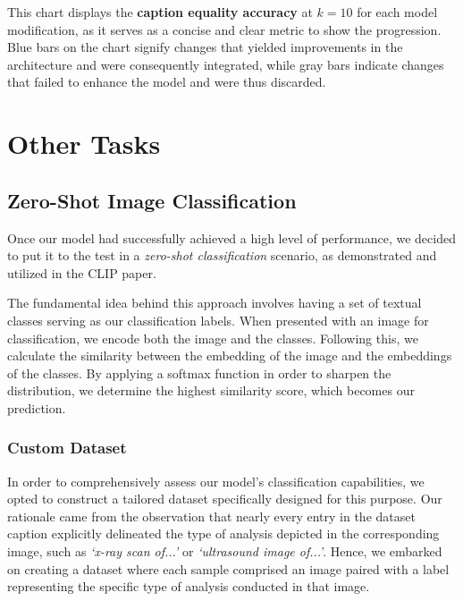 \documentclass[12pt, a4paper]{article}
\begin{document}
This chart displays the \textbf{caption equality accuracy} at $k=10$ for each model modification, as it serves as a concise and clear metric to show the progression. Blue bars on the chart signify changes that yielded improvements in the architecture and were consequently integrated, while gray bars indicate changes that failed to enhance the model and were thus discarded.




\section{Other Tasks}

\subsection{Zero-Shot Image Classification}

Once our model had successfully achieved a high level of performance, we decided to put it to the test in a \textit{zero-shot classification} scenario, as demonstrated and utilized in the CLIP paper.

The fundamental idea behind this approach involves having a set of textual classes serving as our classification labels. When presented with an image for classification, we encode both the image and the classes. Following this, we calculate the similarity between the embedding of the image and the embeddings of the classes. By applying a softmax function in order to sharpen the distribution, we determine the highest similarity score, which becomes our prediction.

\subsubsection{Custom Dataset}
In order to comprehensively assess our model's classification capabilities, we opted to construct a tailored dataset specifically designed for this purpose. Our rationale came from the observation that nearly every entry in the dataset caption explicitly delineated the type of analysis depicted in the corresponding image, such as \textit{`x-ray scan of...'} or \textit{ `ultrasound image of...}'. Hence, we embarked on creating a dataset where each sample comprised an image paired with a label representing the specific type of analysis conducted in that image.
\end{document}

